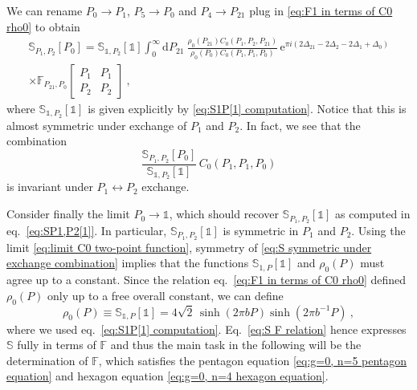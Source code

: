 \documentclass[12pt,a4paper]{article}
\newcommand{\be}{\begin{equation}}
\newcommand{\ee}{\end{equation}}
\renewcommand\d{\text{d}}
\newcommand\id{\mathds{1}}
\begin{document}
We can rename $P_0 \to P_1$, $P_5 \to P_0$ and $P_4 \to P_{21}$ plug in \eqref{eq:F1 in terms of C0 rho0} to obtain
\begin{multline}
    \mathbb{S}_{P_1,P_2}[P_0]=\mathbb{S}_{\id,P_2}[\id]\int_0^\infty\!\! \d P_{21}\ \frac{\rho_0(P_{21}) C_0(P_1,P_2,P_{21})}{\rho_0(P_0) C_0(P_1,P_1,P_0)} \, \mathrm{e}^{\pi i (2 \Delta_{21}-2\Delta_2-2\Delta_1+\Delta_0)} \\ \times  \mathbb{F}_{P_{21},P_0} \!\begin{bmatrix}
        P_1 & P_1 \\P_2 & P_2 
    \end{bmatrix}\ , \label{eq:S F relation}
\end{multline}
where $\mathbb{S}_{\id,P_2}[\id]$ is given explicitly by \eqref{eq:S1P[1] computation}.
Notice that this is almost symmetric under exchange of $P_1$ and $P_2$. In fact, we see that the combination
\be 
\frac{\mathbb{S}_{P_1,P_2}[P_0]}{\mathbb{S}_{\id,P_2}[\id] }\, C_0(P_1,P_1,P_0) \label{eq:S symmetric under exchange combination}
\ee
is invariant under $P_1 \leftrightarrow P_2$ exchange. 

Consider finally the limit $P_0 \to \id$, which should recover $\mathbb{S}_{P_1,P_2}[\id]$ as computed in eq.~\eqref{eq:SP1,P2[1]}. In particular, $\mathbb{S}_{P_1,P_2}[\id]$ is symmetric in $P_1$ and $P_2$. Using the limit \eqref{eq:limit C0 two-point function}, symmetry of \eqref{eq:S symmetric under exchange combination} implies that the functions $\mathbb{S}_{1,P}[\id]$ and $\rho_0(P)$ must agree up to a constant. Since the relation eq.~\eqref{eq:F1 in terms of C0 rho0} defined $\rho_0(P)$ only up to a free overall constant, we can define
\be 
\rho_0(P) \equiv \mathbb{S}_{\id,P}[\id]=4 \sqrt{2}\, \sinh(2\pi b P) \sinh(2\pi b^{-1} P)\ , \label{eq:rho0 definition}
\ee
where we used eq.~\eqref{eq:S1P[1] computation}.
Eq.~\eqref{eq:S F relation} hence expresses $\mathbb{S}$ fully in terms of $\mathbb{F}$ and thus the main task in the following will be the determination of $\mathbb{F}$, which satisfies the pentagon equation \eqref{eq:g=0, n=5 pentagon equation} and hexagon equation \eqref{eq:g=0, n=4 hexagon equation}.
\end{document}
